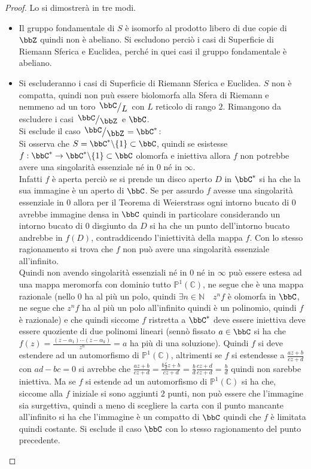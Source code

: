 \begin{proof}Lo si dimostrerà in tre modi.
\begin{itemize}
\item Il gruppo fondamentale di $S$ è isomorfo al prodotto libero di due copie di $\bbZ$ quindi non è abeliano. Si escludono perciò i casi di Superficie di Riemann Sferica e Euclidea, perché in quei casi il gruppo fondamentale è abeliano.
\item Si escluderanno i casi di Superficie di Riemann Sferica e Euclidea. $S$ non è compatta, quindi non puù essere biolomorfa alla Sfera di Riemann e nemmeno ad un toro $\quotient{\bbC}{L}$ con $L$ reticolo di rango $2$. Rimangono da escludere i casi $\quotient{\bbC}{\bbZ}$ e $\bbC$.\\
Si esclude il caso $\quotient{\bbC}{\bbZ}={\bbC}^*$:\\
Si osserva che $S=\bbC^*\minus\{ 1\}\subset\bbC$, quindi se esistesse $f:\bbC^*\rightarrow\bbC^*\minus\{ 1\}\subset\bbC$ olomorfa e iniettiva allora $f$ non potrebbe avere una singolarità essenziale né in $0$ né in $\infty$.\\
Infatti $f$ è aperta perciò se si prende un disco aperto $D$ in $\bbC^*$ si ha che la sua immagine è un aperto di $\bbC$. Se per assurdo $f$ avesse una singolarità essenziale in $0$ allora per il Teorema di Weierstrass ogni intorno bucato di $0$ avrebbe immagine densa in $\bbC$ quindi in particolare considerando un intorno bucato di $0$ disgiunto da $D$ si ha che un punto dell'intorno bucato andrebbe in $f(D)$, contraddicendo l'iniettività della mappa $f$. Con lo stesso ragionamento si trova che $f$ non può avere una singolarità essenziale all'infinito.\\
Quindi non avendo singolarità essenziali né in $0$ né in $\infty$ può essere estesa ad una mappa meromorfa con dominio tutto $\mathbb{P}^1(\mathbb{C})$, ne segue che è una mappa razionale (nello $0$ ha al più un polo, quindi $\exists n\in\mathbb{N} \quad z^nf$ è olomorfa in $\bbC$, ne segue che $z^nf$ ha al più un polo all'infinito quindi è un polinomio, quindi $f$ è razionale) e che quindi siccome $f$ ristretta a $\bbC^*$ deve essere iniettiva deve essere quoziente di due polinomi lineari (sennò fissato $a\in\bbC$ si ha che $f(z)=\frac{(z-\alpha_1)\cdots (z-\alpha_k)}{z^n}=a$ ha più di una soluzione). Quindi $f$ si deve estendere ad un automorfismo di $\mathbb{P}^1(\mathbb{C})$, altrimenti se $f$ si estendesse a $\frac{az+b}{cz+d}$ con $ad-bc=0$ si avrebbe che $\frac{az+b}{cz+d}=\frac{b\frac{c}{d} z+b}{cz+d}=\frac{b}{d} \frac{cz+d}{cz+d}=\frac{b}{d}$ quindi non sarebbe iniettiva. Ma se $f$ si estende ad un automorfismo di $\mathbb{P}^1(\mathbb{C})$ si ha che, siccome alla $f$ iniziale si sono aggiunti $2$ punti, non può essere che l'immagine sia surgettiva, quindi a meno di scegliere la carta con il punto mancante all'infinito si ha che l'immagine è un compatto di $\bbC$ quindi che $f$ è limitata quindi costante.
Si esclude il caso $\bbC$ con lo stesso ragionamento del punto precedente.


\end{itemize}
\end{proof}

